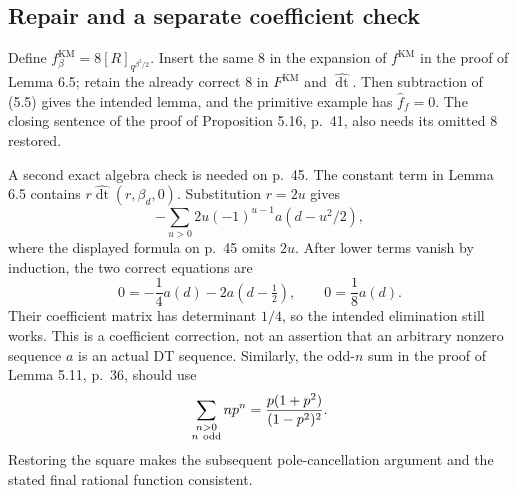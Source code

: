 \documentclass[10pt]{article}
\begin{document}
\subsection*{Repair and a separate coefficient check}
Define \(f_\beta^{\mathrm{KM}}=8[R]_{q^{\beta^2/2}}\). Insert the same \(8\) in the expansion of \(f^{\mathrm{KM}}\) in the proof of Lemma 6.5; retain the already correct \(8\) in \(F^{\mathrm{KM}}\) and \(\widehat{\mathop{\mathrm{dt}}}\). Then subtraction of (5.5) gives the intended lemma, and the primitive example has \(\widehat f_f=0\). The closing sentence of the proof of Proposition 5.16, p. 41, also needs its omitted \(8\) restored.\par
A second exact algebra check is needed on p. 45. The constant term in Lemma 6.5 contains \(r\widehat{\mathop{\mathrm{dt}}}(r,\beta_d,0)\). Substitution \(r=2u\) gives \[-\sum_{u>0}2u(-1)^{u-1}a(d-u^2/2),\] where the displayed formula on p. 45 omits \(2u\). After lower terms vanish by induction, the two correct equations are \[0=-\frac14a(d)-2a(d-\tfrac12),
 \qquad 0=\frac18a(d).\] Their coefficient matrix has determinant \(1/4\), so the intended elimination still works. This is a coefficient correction, not an assertion that an arbitrary nonzero sequence \(a\) is an actual DT sequence. Similarly, the odd-\(n\) sum in the proof of Lemma 5.11, p. 36, should use \[\sum_{\substack{n>0\\n\ {\rm odd}}}np^n
   =\frac{p(1+p^2)}{(1-p^2)^2}.\] Restoring the square makes the subsequent pole-cancellation argument and the stated final rational function consistent.\par
\end{document}
